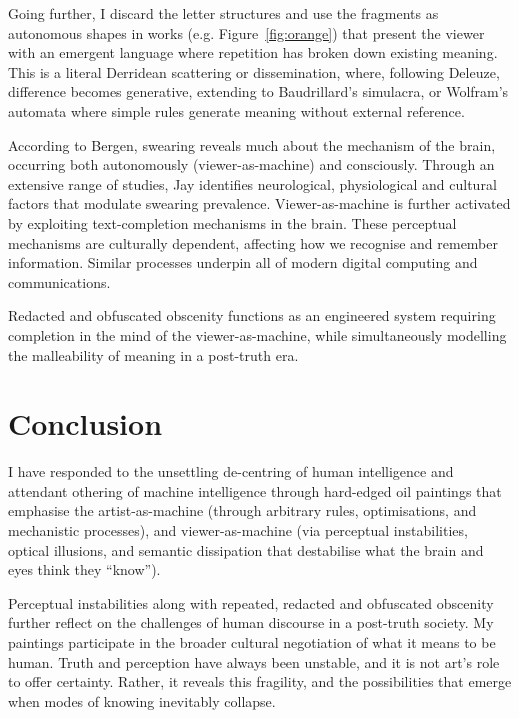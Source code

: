 \documentclass[12pt]{article}
\begin{document}
Going further, I discard the letter structures and use the fragments
as autonomous shapes in works (e.g. Figure~\ref{fig:orange}) that
present the viewer with an emergent language where repetition has
broken down existing meaning. This is a literal Derridean scattering
or dissemination,\autocite{derrida1972dissemination} where, following
Deleuze,\autocite{deleuze1968difference} difference becomes generative,
extending to Baudrillard's simulacra,\autocite{baudrillard1981simulacra}
or Wolfram's automata\autocite{wolfram} where simple rules generate
meaning without external reference.

According to Bergen, swearing reveals much about the mechanism of the
brain, occurring both autonomously (viewer-as-machine) and
consciously.\autocite{bergen2018what} Through an extensive range of
studies, Jay identifies neurological, physiological and cultural
factors that modulate swearing prevalence.\autocite{jay1999why}
Viewer-as-machine is further activated by exploiting text-completion
mechanisms in the
brain.\autocite{Taylor1953,Reicher1969,Healy1976,GraingerWhitney2004,CohenDehaene2000,Levy2008}
These perceptual mechanisms are culturally
dependent,\autocite{Bartlett1932,Hall1976,ChuaBolandNisbett2005,MasudaNisbett2001}
affecting how we recognise and remember information. Similar processes
underpin all of modern digital computing and
communications.\autocite{shannon1948}

Redacted and obfuscated obscenity functions as an engineered system
requiring completion in the mind of the viewer-as-machine, while
simultaneously modelling the malleability of meaning in a post-truth
era.

\section{Conclusion}
I have responded to the unsettling de-centring of human intelligence
and attendant othering of machine intelligence through hard-edged oil
paintings that emphasise the artist-as-machine (through
arbitrary rules, optimisations, and mechanistic processes), and
viewer-as-machine (via perceptual instabilities, optical illusions,
and semantic dissipation that destabilise what the brain and eyes
think they ``know'').

Perceptual instabilities along with repeated, redacted and obfuscated
obscenity further reflect on the challenges of human discourse in a
post-truth society. My paintings participate in the broader cultural
negotiation of what it means to be human. Truth and perception have
always been unstable, and it is not art's role to offer
certainty. Rather, it reveals this fragility, and the possibilities
that emerge when modes of knowing inevitably collapse.
\end{document}
